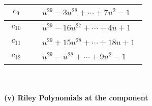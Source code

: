 \documentclass[1p]{elsarticle_modified}
\theoremstyle{definition}
\begin{document}
\begin{tabular}{m{50pt}|m{274pt}}
\hline $$\begin{aligned}c_{9}\end{aligned}$$&$\begin{aligned}
&u^{29}-3 u^{28}+\cdots+7 u^2-1
\end{aligned}$\\
\hline $$\begin{aligned}c_{10}\end{aligned}$$&$\begin{aligned}
&u^{29}-16 u^{27}+\cdots+4 u+1
\end{aligned}$\\
\hline $$\begin{aligned}c_{11}\end{aligned}$$&$\begin{aligned}
&u^{29}+15 u^{28}+\cdots+18 u+1
\end{aligned}$\\
\hline $$\begin{aligned}c_{12}\end{aligned}$$&$\begin{aligned}
&u^{29}- u^{28}+\cdots+9 u^2-1
\end{aligned}$\\
\hline
\end{tabular}\\~\\
\newpage\renewcommand{\arraystretch}{1}
\flushleft \textbf{(v) Riley Polynomials at the component}\newline \\
\end{document}
